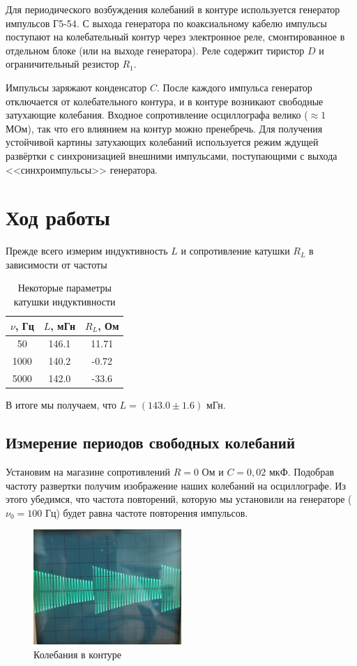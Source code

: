\documentclass[a4paper,12pt]{article} %
\begin{document}
Для периодического возбуждения колебаний в контуре используется генератор импульсов Г5-54. С выхода генератора по коаксиальному кабелю импульсы поступают на колебательный контур через электронное реле, смонтированное в отдельном блоке (или на выходе генератора). Реле содержит тиристор $D$ и ограничительный резистор $R_1$.

Импульсы заряжают конденсатор $C$. После каждого импульса генератор отключается от колебательного контура, и в контуре возникают свободные затухающие колебания. Входное сопротивление осциллографа велико ($\approx 1$ МОм), так что его влиянием на контур можно пренебречь. Для получения устойчивой картины затухающих колебаний используется режим ждущей развёртки с синхронизацией внешними импульсами, поступающими с выхода <<синхроимпульсы>> генератора.
\newpage
\section*{Ход работы}
Прежде всего измерим индуктивность $L$ и сопротивление катушки $R_L$ в зависимости от частоты 

\begin{table}[h!]
\begin{center}

\begin{tabular}{|c|c|c|}
\hline
$\nu$, Гц & $L$, мГн & $R_L$, Ом \\ \hline
50        & 146.1    & 11.71      \\ \hline
1000      & 140.2    & -0.72      \\ \hline
5000      & 142.0    & -33.6      \\ \hline
\end{tabular}
\caption{Некоторые параметры катушки индуктивности}
\end{center}
\end{table}
В итоге мы получаем, что $L = (143.0 \pm 1.6)$ мГн. 
\subsection*{Измерение периодов свободных колебаний}
Установим на магазине сопротивлений $R = 0$ Ом и $C = 0,02$ мкФ. Подобрав частоту развертки получим изображение наших колебаний на осциллографе. Из этого убедимся, что частота повторений, которую мы установили на генераторе ($\nu_0 = 100$ Гц) будет равна частоте повторения импульсов. 

\begin{figure}[h!]
\begin{center}
\includegraphics[width = 0.5\textwidth]{3.jpg}
\caption{Колебания в контуре}
\end{center}
\end{figure}
\end{document}
